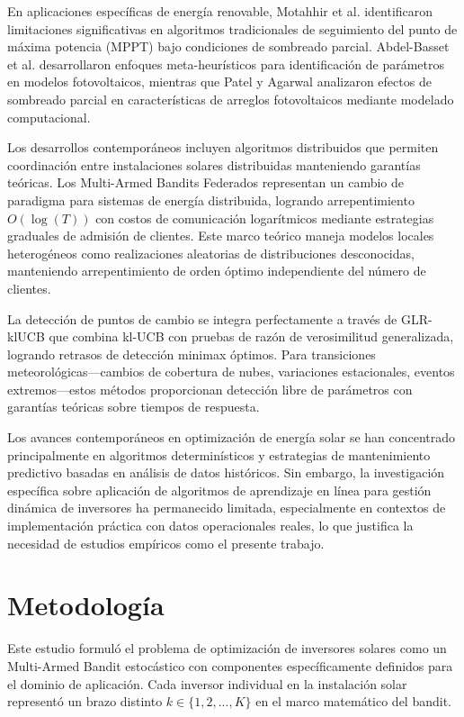 \documentclass[conference]{IEEEtran}
\begin{document}
En aplicaciones específicas de energía renovable, Motahhir et al. \cite{motahhir2020} identificaron limitaciones significativas en algoritmos tradicionales de seguimiento del punto de máxima potencia (MPPT) bajo condiciones de sombreado parcial. Abdel-Basset et al. \cite{abdel2021} desarrollaron enfoques meta-heurísticos para identificación de parámetros en modelos fotovoltaicos, mientras que Patel y Agarwal \cite{patel2020} analizaron efectos de sombreado parcial en características de arreglos fotovoltaicos mediante modelado computacional.

Los desarrollos contemporáneos incluyen algoritmos distribuidos que permiten coordinación entre instalaciones solares distribuidas manteniendo garantías teóricas. Los Multi-Armed Bandits Federados representan un cambio de paradigma para sistemas de energía distribuida, logrando arrepentimiento $O(\log(T))$ con costos de comunicación logarítmicos mediante estrategias graduales de admisión de clientes. Este marco teórico maneja modelos locales heterogéneos como realizaciones aleatorias de distribuciones desconocidas, manteniendo arrepentimiento de orden óptimo independiente del número de clientes.

La detección de puntos de cambio se integra perfectamente a través de GLR-klUCB que combina kl-UCB con pruebas de razón de verosimilitud generalizada, logrando retrasos de detección minimax óptimos. Para transiciones meteorológicas—cambios de cobertura de nubes, variaciones estacionales, eventos extremos—estos métodos proporcionan detección libre de parámetros con garantías teóricas sobre tiempos de respuesta.

Los avances contemporáneos en optimización de energía solar se han concentrado principalmente en algoritmos determinísticos y estrategias de mantenimiento predictivo basadas en análisis de datos históricos. Sin embargo, la investigación específica sobre aplicación de algoritmos de aprendizaje en línea para gestión dinámica de inversores ha permanecido limitada, especialmente en contextos de implementación práctica con datos operacionales reales, lo que justifica la necesidad de estudios empíricos como el presente trabajo.

\section{Metodología}

Este estudio formuló el problema de optimización de inversores solares como un Multi-Armed Bandit estocástico con componentes específicamente definidos para el dominio de aplicación. Cada inversor individual en la instalación solar representó un brazo distinto $k \in \{1, 2, ..., K\}$ en el marco matemático del bandit.
\end{document}
